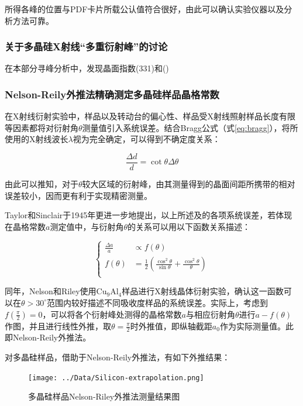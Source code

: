 \documentclass{thuemp}
\begin{document}
所得各峰的位置与PDF卡片所载公认值符合很好，由此可以确认实验仪器以及分析方法可靠。

\subsubsection{关于多晶硅X射线“多重衍射峰”的讨论}

在本部分寻峰分析中，发现晶面指数(331)和()

\subsubsection{Nelson-Reily外推法精确测定多晶硅样品晶格常数}

在X射线衍射实验中，样品以及转动台的偏心性、样品受X射线照射样品长度有限等因素都将对衍射角$\theta$测量值引入系统误差。结合Bragg公式（式\ref{eq:bragg}），将所使用的X射线波长$\lambda$视为完全确定，可以得到不确定度关系：

\begin{equation}
    \frac{\Delta d}{d} = \cot{\theta}\Delta\theta 
    \label{eqn:d_err}
\end{equation}

由此可以推知，对于$\theta$较大区域的衍射峰，由其测量得到的晶面间距所携带的相对误差较小，因而更有利于实现精密测量。

Taylor和Sinclair于1945年更进一步地提出，以上所述及的各项系统误差，若体现在晶格常数$a$测定值中，与衍射角$\theta$的关系可以用以下函数关系描述：

\begin{equation}
    \begin{cases}
        \frac{\Delta a}{a} & \propto f(\theta) \\
        f(\theta) & = \frac{1}{2} \left(\frac{\cos^2\theta}{\sin\theta} + \frac{\cos^2\theta}{\theta}\right) \\
    \end{cases}
\end{equation}

同年，Nelson和Riley使用$\text{Cu}_9\text{Al}_4$样品进行X射线晶体衍射实验，确认这一函数可以在$\theta > 30^\circ$范围内较好描述不同吸收度样品的系统误差。实际上，考虑到$f\left(\frac{\pi}{2}\right) = 0$，可以将各个衍射峰处测得的晶格常数$a$与相应衍射角$\theta$进行$a-f(\theta)$作图，并且进行线性外推，取$\theta=\frac{\pi}{2}$时外推值，即纵轴截距$a_0$作为实际测量值。此即Nelson-Reily外推法。

对多晶硅样品，借助于Nelson-Reily外推法，有如下外推结果：

\begin{figure}[H]
    \centering
    \texttt{[image: ../Data/Silicon-extrapolation.png]}
    \caption{多晶硅样品Nelson-Riley外推法测量结果图}
    \label{fig:si_xrd_extrapol}
\end{figure}
\end{document}

